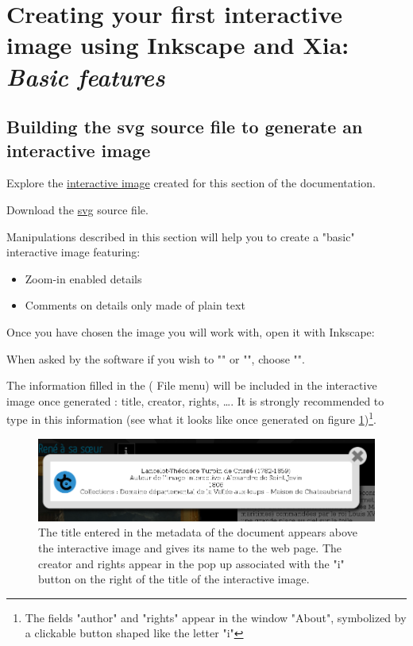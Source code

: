 \section{Creating your first interactive image using Inkscape and Xia: \emph{Basic features}}\label{basic_imageactive}

\subsection{Building the svg source file to generate an interactive image}\label{preparation_svg}

\begin{links}
Explore the \href{http://xia.dane.ac-versailles.fr/demo/tuto/xia1}{interactive image} created for this section of the documentation.

Download the \href{http://xia.dane.ac-versailles.fr/demo/tuto/xia1/svg/xia1.svg}{svg} source file.
\end{links}

Manipulations described in this section will help you to
create a "basic" interactive image featuring:
\begin{itemize}
 \item Zoom-in enabled details
 \item Comments on details only made of plain text
\end{itemize}


Once you have chosen the image you will work with, open it with Inkscape:


When asked by the software if you wish to "" or "", choose "".

The information filled in the  (\chemin
{File} menu) will be included in the interactive image once
generated : title, creator, rights, \ldots. It is strongly recommended to type in this information
(see what it looks like once generated on figure \ref{titre_ia})\footnote{The
fields "author" and "rights" appear in the window
"About", symbolized by a clickable button shaped like the letter "i"}.

\begin{figure}[htp]
 \centering
 \includegraphics[width=\textwidth]{images/titre_ia}
 \caption[How do metadata display in the html5 animation]{The title entered in the metadata of the document appears above 
the interactive image and gives its name to the web page. The creator and 
 rights appear in the pop up associated with the "i" button 
on the right of the title of the interactive image.}
 \label{titre_ia}
\end{figure}

